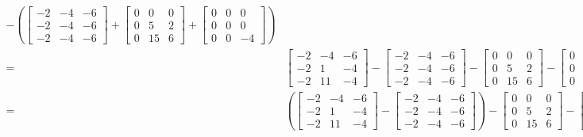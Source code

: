 \begin{tcolorbox}[title=\textbf{\Large Let's remind ourselves why this works:}]
\begin{align*}
    - \left( \left[ \begin{array}{rrr} -2 & -4 & -6 \\ -2 & -4 & -6 \\ -2 & -4 & -6 \end{array} \right] +  \left[ \begin{array}{rrr} 0 & 0 & 0 \\ 0 & 5 & 2 \\ 0 & 15 & 6 \end{array} \right] + \left[ \begin{array}{rrr} 0 & 0 & 0 \\ 0 & 0 & 0 \\ 0 & 0 & -4 \end{array} \right] \right) \\ 
    =& \left[ \begin{array}{rrr} -2 & -4 & -6 \\ -2 & 1 & -4 \\ -2 & 11 & -4 \end{array} \right] 
    - \left[ \begin{array}{rrr} -2 & -4 & -6 \\ -2 & -4 & -6 \\ -2 & -4 & -6 \end{array} \right] -  \left[ \begin{array}{rrr} 0 & 0 & 0 \\ 0 & 5 & 2 \\ 0 & 15 & 6 \end{array} \right] - \left[ \begin{array}{rrr} 0 & 0 & 0 \\ 0 & 0 & 0 \\ 0 & 0 & -4 \end{array} \right] \\ 
    =& \left( \left[ \begin{array}{rrr} -2 & -4 & -6 \\ -2 & 1 & -4 \\ -2 & 11 & -4 \end{array} \right] - \left[ \begin{array}{rrr} -2 & -4 & -6 \\ -2 & -4 & -6 \\ -2 & -4 & -6 \end{array} \right] \right) -  \left[ \begin{array}{rrr} 0 & 0 & 0 \\ 0 & 5 & 2 \\ 0 & 15 & 6 \end{array} \right] - \left[ \begin{array}{rrr} 0 & 0 & 0 \\ 0 & 0 & 0 \\ 0 & 0 & -4 \end{array} \right] \\ 

\end{align*}
\end{tcolorbox}
